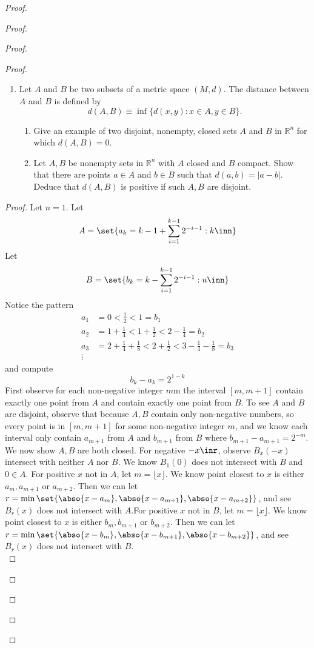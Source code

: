 \documentclass{report}
\begin{document}
\begin{proof}
\begin{proof}
\begin{proof}
\begin{proof}
\begin{question}{}{}
\begin{enumerate}
    \item Let \( A \) and \( B \) be two subsets of a metric space \( (M,d) \). The distance between \( A \) and \( B \) is defined by
    \[
    d(A,B) \equiv \inf\{d(x,y) : x \in A, y \in B\}.
    \]
    \begin{enumerate}
        \item Give an example of two disjoint, nonempty, closed sets \( A \) and \( B \) in \( \mathbb{R}^n \) for which \( d(A, B) = 0 \).
        \item Let \( A, B \) be nonempty sets in \( \mathbb{R}^n \) with \( A \) closed and \( B \) compact. Show that there are points \( a \in A \) and \( b \in B \) such that \( d(a, b) = |a-b| \). Deduce that \( d(A, B) \) is positive if such \( A, B \) are disjoint.
    \end{enumerate}
\end{enumerate}
\end{question}
\begin{proof}
Let $n=1$. Let 
\begin{equation}
A=\set{a_k=k-1+\sum_{i=1}^{k-1}2^{-i-1}:k\inn}
\end{equation}
Let
\begin{equation}
B=\set{b_k=k-\sum_{i=1}^{k-1}2^{-i-1}:u\inn}
\end{equation}
Notice the pattern
\begin{align}
  a_1&=0<\frac{1}{2}< 1=b_1\\
  a_2&=1+\frac{1}{4}< 1+\frac{1}{2}< 2-\frac{1}{4}=b_2\\
  a_3&=2+\frac{1}{4}+\frac{1}{8}< 2+\frac{1}{2}< 3-\frac{1}{4}-\frac{1}{8}=b_3\\
  \vdots
\end{align}
and compute
\begin{equation}
b_k-a_k=2^{1-k}
\end{equation}
First observe for each non-negative integer $m$m the interval  $[m,m+1]$ contain exactly one point from $A$ and contain exactly one point from  $B$. To see  $A$ and  $B$ are disjoint, observe that because  $A,B$ contain only non-negative numbers, so every point is in $[m,m+1]$ for some non-negative integer $m$, and we know each interval only contain $a_{m+1}$ from $A$ and $b_{m+1}$ from $B$ where  $b_{m+1}-a_{m+1}=2^{-m}$.\\

We now show $A,B$ are both closed. For negative  $-x\inr$, observe $B_{x}(-x)$ intersect with neither $A$ nor  $B$. We know $B_1(0)$ does not intersect with $B$ and  $0\in A$. For positive $x$ not in $A$, let $m=\lfloor x \rfloor$. We know point closest to $x$ is either $a_{m},a_{m+1}\text{ or }a_{m+2}$. Then we can let $r=\min \set{\abso{x-a_m},\abso{x-a_{m+1}},\abso{x-a_{m+2}}}$, and see $B_r(x)$ does not intersect with $A$.For positive $x$ not in $B$, let $m=\lfloor x \rfloor$. We know point closest to $x$ is either $b_{m},b_{m+1}\text{ or }b_{m+2}$. Then we can let $r=\min \set{\abso{x-b_m},\abso{x-b_{m+1}},\abso{x-b_{m+2}}}$, and see $B_r(x)$ does not intersect with $B$.\\


\end{proof}
\end{proof}
\end{proof}
\end{proof}
\end{proof}
\end{document}
